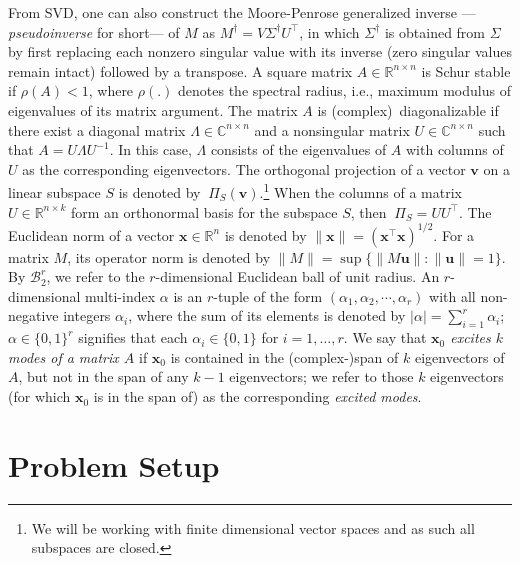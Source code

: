 \documentclass[journal]{IEEEtran}
\theoremstyle{definition}
\theoremstyle{remark}
\newcommand\x{{\bm x}}
\def\u{{\bm u}}
\begin{document}
    From SVD, one can also construct the Moore-Penrose generalized inverse ---\textit{pseudoinverse} for short--- of $M$ as $M^{\dagger}={V}\Sigma^{\dagger}{U}^\intercal$, in which $\Sigma^{\dagger}$ is obtained from $\Sigma$ by first replacing each nonzero singular value with its inverse (zero singular values remain intact) followed by a transpose.
	A square matrix $A \in \mathbb{R}^{n\times n}$ is Schur stable if $\rho(A) < 1$, where $\rho(.)$ denotes the spectral radius, i.e., maximum modulus of eigenvalues of its matrix argument. The matrix $A$ is (complex)~{diagonalizable} if there exist a diagonal matrix $\Lambda \in \mathbb{C}^{n\times n}$ and a nonsingular matrix $U \in \mathbb{C}^{n\times n}$ such that $A = U \Lambda U^{-1}$.
	In this case, $\Lambda$ consists of the eigenvalues of $A$ with columns of $U$ as the corresponding eigenvectors. 
    The orthogonal projection of a vector $\bm v$ on a linear subspace $S$ is denoted by $~\Pi_{S}(\bm v)$.\footnote{We will be working with finite dimensional vector spaces and as such all subspaces are closed.}
    When the columns of a matrix $U\in \mathbb{R}^{n \times k}$ form an orthonormal basis for the subspace $S$, then $~\Pi_{S} = U U^\intercal$.
	The {Euclidean norm} of a vector $\x \in\mathbb{R}^n$ is denoted by $\| \x \|=(\x^\intercal \x)^{1/2}$.
	For a matrix $M$, its {operator norm} is denoted by $\|M\|=\sup\{\| M {\u} \|: \|{\u} \|=1\}$.
	By $\mathcal{B}_{2}^r$, we refer to the $r$-dimensional Euclidean ball of unit radius.
	An $r$-dimensional multi-index $\alpha$ is an $r$-tuple of the form $(\alpha_1, \alpha_2, \cdots, \alpha_r)$ with all non-negative integers $\alpha_i$, where the sum of its elements is denoted by $|\alpha| = \sum_{i=1}^r \alpha_i$;
 $\alpha \in \{0,1\}^r$ signifies that each $\alpha_i\in\{0,1\}$ for $i=1,\dots,r$.
	We say that \textit{$\x_0$ excites $k$ modes of a matrix $A$} if $\x_0$ is contained in the (complex-)span of $k$ eigenvectors of $A$, but not in the span of any $k-1$ eigenvectors;
	we refer to those $k$ eigenvectors (for which $\x_0$ is in the span of) as the corresponding \textit{excited modes}.
\section{Problem Setup}
\label{sec:probSetup}
\end{document}
